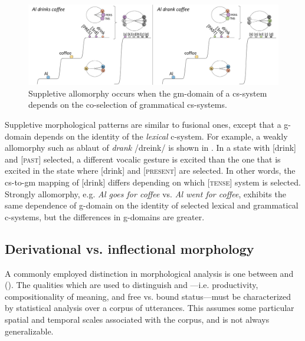   
\begin{figure}
\includegraphics[width=\textwidth]{figures/Tilsen-img69.png}
\caption{Suppletive allomorphy occurs when the gm-domain of a cs-system depends on the co-selection of grammatical cs-systems.}
\label{fig:4:19}
\end{figure}
 

  Suppletive morphological patterns are similar to fusional ones, except that a  g-domain depends on the identity of the \textit{lexical} c-system. For example, a weakly  allomorphy such as ablaut of \textit{drank} /dreink/ is shown in {}. In a state with [drink] and [\textsc{past}] selected, a different vocalic gesture is excited than the one that is excited in the state where [drink] and [\textsc{present}] are selected. In other words, the cs-to-gm mapping of [drink] differs depending on which [\textsc{tense}] system is selected. Strongly  allomorphy, e.g. \textit{Al goes for coffee} vs. \textit{Al went for coffee}, exhibits the same dependence of g-domain on the identity of selected lexical and grammatical c-systems, but the differences in g-domains are greater.

\subsection{Derivational vs. inflectional morphology}

A commonly employed distinction in morphological analysis is one between  and  (\citealt{BickelNichols2007,Booij1996,Dressler1989,HaspelmathSims2013}). The qualities which are used to distinguish  and —i.e. productivity, compositionality of meaning, and free vs. bound status—must be characterized by statistical analysis over a corpus of utterances. This assumes some particular spatial and temporal scales associated with the corpus, and is not always generalizable. 

